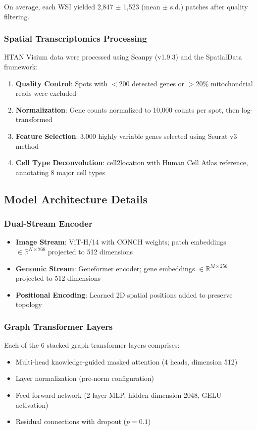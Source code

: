 \documentclass[11pt,a4paper]{article}
\begin{document}
On average, each WSI yielded 2,847 $\pm$ 1,523 (mean $\pm$ s.d.) patches after quality filtering.

\subsubsection{Spatial Transcriptomics Processing}
HTAN Visium data were processed using Scanpy (v1.9.3) and the SpatialData framework:

\begin{enumerate}
    \item \textbf{Quality Control}: Spots with $<$200 detected genes or $>$20\% mitochondrial reads were excluded
    \item \textbf{Normalization}: Gene counts normalized to 10,000 counts per spot, then log-transformed
    \item \textbf{Feature Selection}: 3,000 highly variable genes selected using Seurat v3 method
    \item \textbf{Cell Type Deconvolution}: cell2location with Human Cell Atlas reference, annotating 8 major cell types
\end{enumerate}

\subsection{Model Architecture Details}

\subsubsection{Dual-Stream Encoder}
\begin{itemize}
    \item \textbf{Image Stream}: ViT-H/14 with CONCH weights; patch embeddings $\in \mathbb{R}^{N \times 768}$ projected to 512 dimensions
    \item \textbf{Genomic Stream}: Geneformer encoder; gene embeddings $\in \mathbb{R}^{M \times 256}$ projected to 512 dimensions
    \item \textbf{Positional Encoding}: Learned 2D spatial positions added to preserve topology
\end{itemize}

\subsubsection{Graph Transformer Layers}
Each of the 6 stacked graph transformer layers comprises:
\begin{itemize}
    \item Multi-head knowledge-guided masked attention (4 heads, dimension 512)
    \item Layer normalization (pre-norm configuration)
    \item Feed-forward network (2-layer MLP, hidden dimension 2048, GELU activation)
    \item Residual connections with dropout ($p = 0.1$)
\end{itemize}
\end{document}
